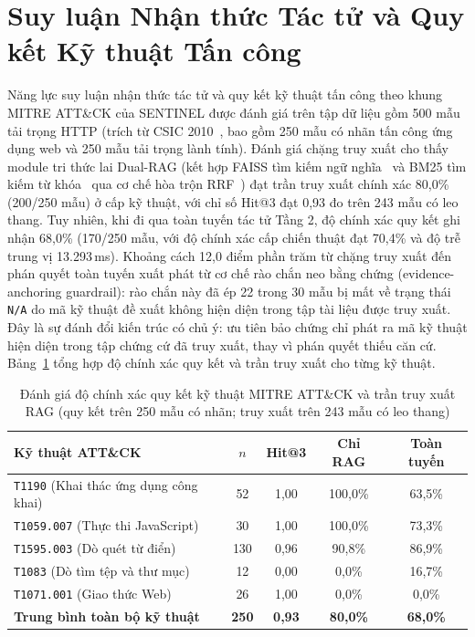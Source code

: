 \section{Suy luận Nhận thức Tác tử và Quy kết Kỹ thuật Tấn công}
\label{sec:tier2_accuracy_rag}

Năng lực suy luận nhận thức tác tử và quy kết kỹ thuật tấn công theo khung MITRE ATT\&CK của SENTINEL được đánh giá trên tập dữ liệu gồm 500 mẫu tải trọng HTTP (trích từ CSIC 2010~\cite{csic2010}, bao gồm 250 mẫu có nhãn tấn công ứng dụng web và 250 mẫu tải trọng lành tính). Đánh giá chặng truy xuất cho thấy module tri thức lai Dual-RAG (kết hợp FAISS tìm kiếm ngữ nghĩa~\cite{faiss2019} và BM25 tìm kiếm từ khóa~\cite{bm25_2009} qua cơ chế hòa trộn RRF~\cite{rrf2009}) đạt trần truy xuất chính xác 80,0\% (200/250 mẫu) ở cấp kỹ thuật, với chỉ số Hit@3 đạt 0,93 đo trên 243 mẫu có leo thang. Tuy nhiên, khi đi qua toàn tuyến tác tử Tầng 2, độ chính xác quy kết ghi nhận 68,0\% (170/250 mẫu, với độ chính xác cấp chiến thuật đạt 70,4\% và độ trễ trung vị 13.293\,ms). Khoảng cách 12,0 điểm phần trăm từ chặng truy xuất đến phán quyết toàn tuyến xuất phát từ cơ chế rào chắn neo bằng chứng (evidence-anchoring guardrail): rào chắn này đã ép 22 trong 30 mẫu bị mất về trạng thái \texttt{N/A} do mã kỹ thuật đề xuất không hiện diện trong tập tài liệu được truy xuất. Đây là sự đánh đổi kiến trúc có chủ ý: ưu tiên bảo chứng chỉ phát ra mã kỹ thuật hiện diện trong tập chứng cứ đã truy xuất, thay vì phán quyết thiếu căn cứ. Bảng~\ref{tab:rq3_attribution} tổng hợp độ chính xác quy kết và trần truy xuất cho từng kỹ thuật.

\begin{table}[htbp]
\centering
\caption[Đánh giá độ chính xác quy kết kỹ thuật MITRE ATT\&CK]{Đánh giá độ chính xác quy kết kỹ thuật MITRE ATT\&CK và trần truy xuất RAG (quy kết trên 250 mẫu có nhãn; truy xuất trên 243 mẫu có leo thang)}
\label{tab:rq3_attribution}
\footnotesize
\setlength{\tabcolsep}{4pt}
\begin{tabularx}{\textwidth}{>{\raggedright\arraybackslash}X c c c c}
\toprule
\textbf{Kỹ thuật ATT\&CK} & \textbf{$n$} & \textbf{Hit@3} & \textbf{Chỉ RAG} & \textbf{Toàn tuyến} \\
\midrule
\texttt{T1190} (Khai thác ứng dụng công khai) & 52 & 1,00 & 100,0\% & 63,5\% \\
\texttt{T1059.007} (Thực thi JavaScript) & 30 & 1,00 & 100,0\% & 73,3\% \\
\texttt{T1595.003} (Dò quét từ điển) & 130 & 0,96 & 90,8\% & 86,9\% \\
\texttt{T1083} (Dò tìm tệp và thư mục) & 12 & 0,00 & 0,0\% & 16,7\% \\
\texttt{T1071.001} (Giao thức Web) & 26 & 1,00 & 0,0\% & 0,0\% \\
\midrule
\textbf{Trung bình toàn bộ kỹ thuật} & \textbf{250} & \textbf{0,93} & \textbf{80,0\%} & \textbf{68,0\%} \\
\bottomrule
\end{tabularx}
\end{table}

